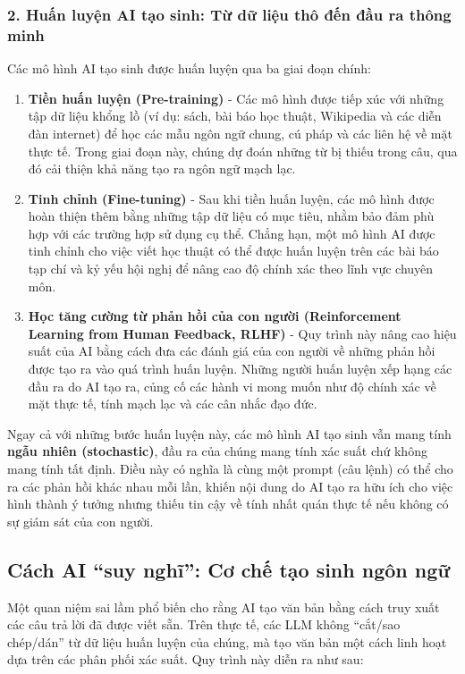 \subsubsection{2. Huấn luyện AI tạo sinh: Từ dữ liệu thô đến đầu ra thông minh}

Các mô hình AI tạo sinh được huấn luyện qua ba giai đoạn chính:

\begin{enumerate}
\def\labelenumi{\arabic{enumi}.}
\item
  \textbf{Tiền huấn luyện (Pre-training)} - Các mô hình được tiếp xúc với những tập dữ liệu khổng lồ (ví dụ: sách, bài báo học thuật, Wikipedia và các diễn đàn internet) để học các mẫu ngôn ngữ chung, cú pháp và các liên hệ về mặt thực tế. Trong giai đoạn này, chúng dự đoán những từ bị thiếu trong câu, qua đó cải thiện khả năng tạo ra ngôn ngữ mạch lạc.
\item
  \textbf{Tinh chỉnh (Fine-tuning)} - Sau khi tiền huấn luyện, các mô hình được hoàn thiện thêm bằng những tập dữ liệu có mục tiêu, nhằm bảo đảm phù hợp với các trường hợp sử dụng cụ thể. Chẳng hạn, một mô hình AI được tinh chỉnh cho việc viết học thuật có thể được huấn luyện trên các bài báo tạp chí và kỷ yếu hội nghị để nâng cao độ chính xác theo lĩnh vực chuyên môn.
\item
  \textbf{Học tăng cường từ phản hồi của con người (Reinforcement Learning from Human Feedback, RLHF)} - Quy trình này nâng cao hiệu suất của AI bằng cách đưa các đánh giá của con người về những phản hồi được tạo ra vào quá trình huấn luyện. Những người huấn luyện xếp hạng các đầu ra do AI tạo ra, củng cố các hành vi mong muốn như độ chính xác về mặt thực tế, tính mạch lạc và các cân nhắc đạo đức.
\end{enumerate}

Ngay cả với những bước huấn luyện này, các mô hình AI tạo sinh vẫn mang tính \textbf{ngẫu nhiên (stochastic)}, đầu ra của chúng mang tính xác suất chứ không mang tính tất định. Điều này có nghĩa là cùng một prompt (câu lệnh) có thể cho ra các phản hồi khác nhau mỗi lần, khiến nội dung do AI tạo ra hữu ích cho việc hình thành ý tưởng nhưng thiếu tin cậy về tính nhất quán thực tế nếu không có sự giám sát của con người.

\subsection{Cách AI ``suy nghĩ'': Cơ chế tạo sinh ngôn ngữ}

Một quan niệm sai lầm phổ biến cho rằng AI tạo văn bản bằng cách truy xuất các câu trả lời đã được viết sẵn. Trên thực tế, các LLM không ``cắt/sao chép/dán'' từ dữ liệu huấn luyện của chúng, mà tạo văn bản một cách linh hoạt dựa trên các phân phối xác suất. Quy trình này diễn ra như sau:

